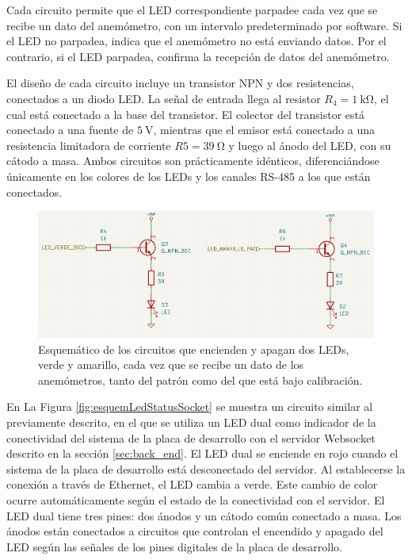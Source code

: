 Cada circuito permite que el LED correspondiente parpadee cada vez que se recibe un dato del anemómetro, con un intervalo predeterminado por software. Si el LED no parpadea, indica que el anemómetro no está enviando datos. Por el contrario, si el LED parpadea, confirma la recepción de datos del anemómetro.

El diseño de cada circuito incluye un transistor NPN y dos resistencias, conectados a un diodo LED. La señal de entrada llega al resistor $ R_4 = \SI{1}{\kilo\ohm} $, el cual está conectado a la base del transistor. El colector del transistor está conectado a una fuente de $\SI{5}{\volt} $, mientras que el emisor está conectado a una resistencia limitadora de corriente $ R5 = \SI{39}{\ohm}$ y luego al ánodo del LED, con su cátodo a masa. Ambos circuitos son prácticamente idénticos, diferenciándose únicamente en los colores de los LEDs y los canales RS-485 a los que están conectados.

\begin{figure}[H]
    \centering
    \includegraphics[width=0.95\linewidth]{Figuras/datalogger/Hardware/esquemLedsSensor.png}
    \caption{Esquemático de los circuitos que encienden y apagan dos LEDs, verde y amarillo, cada vez que se recibe un dato de los anemómetros, tanto del patrón como del que está bajo calibración.}

    \label{fig:esquemLedsSensor}
\end{figure}

En La Figura \ref{fig:esquemLedStatusSocket} se muestra un circuito similar al previamente descrito, en el que se utiliza un LED dual como indicador de la conectividad del sistema de la placa de desarrollo con el servidor Websocket descrito en la sección \ref{sec:back_end}. El LED dual se enciende en rojo cuando el sistema de la placa de desarrollo está desconectado del servidor. Al establecerse la conexión a través de Ethernet, el LED cambia a verde. Este cambio de color ocurre automáticamente según el estado de la conectividad con el servidor. El LED dual tiene tres pines: dos ánodos y un cátodo común conectado a masa. Los ánodos están conectados a circuitos que controlan el encendido y apagado del LED según las señales de los pines digitales de la placa de desarrollo.

